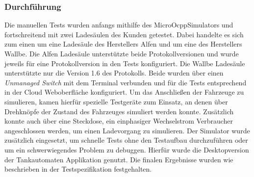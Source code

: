 \subsubsection{Durchführung}
Die manuellen Tests wurden anfangs mithilfe des MicroOcppSimulators und fortschreitend mit zwei Ladesäulen des Kunden getestet. Dabei handelte es sich zum einen um eine Ladesäule des Herstellers \glqq{}Alfen\grqq{} und um eine des Herstellers \glqq{}Wallbe\grqq{}. Die Alfen Ladesäule unterstützte beide Protokollversionen und wurde jeweils für eine Protokollversion in den Tests konfiguriert. Die Wallbe Ladesäule unterstützte nur die Version 1.6 des Protokolls. Beide wurden über einen \textit{Unmanaged Switch} mit dem Terminal verbunden und für die Tests entsprechend in der Cloud Weboberfläche konfiguriert. Um das Anschließen der Fahrzeuge zu simulieren, kamen hierfür spezielle Testgeräte zum Einsatz, an denen über Drehknöpfe der Zustand des Fahrzeuges simuliert werden konnte. Zusätzlich konnte auch über eine Steckdose, ein einphasiger Wechselstrom Verbraucher angeschlossen werden, um einen Ladevorgang zu simulieren. 
Der Simulator wurde zusätzlich eingesetzt, um schnelle Tests ohne den Testaufbau durchzuführen oder um ein schwerwiegendes Problem zu debuggen. Hierfür wurde die Desktopversion der Tankautomaten Applikation genutzt. Die finalen Ergebnisse wurden wie beschrieben in der Testspezifikation festgehalten. 
